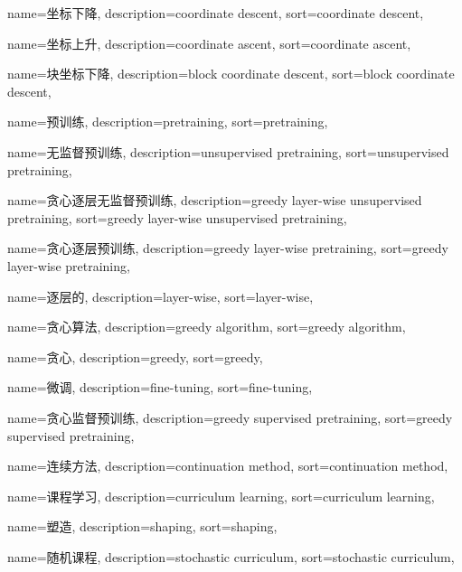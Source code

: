{
  name=坐标下降,
  description={coordinate descent},
  sort={coordinate descent},
}

{
  name=坐标上升,
  description={coordinate ascent},
  sort={coordinate ascent},
}

{
  name=块坐标下降,
  description={block coordinate descent},
  sort={block coordinate descent},
}

{
  name=预训练,
  description={pretraining},
  sort={pretraining},
}

{
  name=无监督预训练,
  description={unsupervised pretraining},
  sort={unsupervised pretraining},
}

{
  name=贪心逐层无监督预训练,
  description={greedy layer-wise unsupervised pretraining},
  sort={greedy layer-wise unsupervised pretraining},
}

{
  name=贪心逐层预训练,
  description={greedy layer-wise pretraining},
  sort={greedy layer-wise pretraining},
}

{
  name=逐层的,
  description={layer-wise},
  sort={layer-wise},
}

{
  name=贪心算法,
  description={greedy algorithm},
  sort={greedy algorithm},
}

{
  name=贪心,
  description={greedy},
  sort={greedy},
}

{
  name=微调,
  description={fine-tuning},
  sort={fine-tuning},
}

{
  name=贪心监督预训练,
  description={greedy supervised pretraining},
  sort={greedy supervised pretraining},
}

{
  name=连续方法,
  description={continuation method},
  sort={continuation method},
}

{
  name=课程学习,
  description={curriculum learning},
  sort={curriculum learning},
}

{
  name=塑造, %
  description={shaping},
  sort={shaping},
}

{
  name=随机课程,
  description={stochastic curriculum},
  sort={stochastic curriculum},
}

